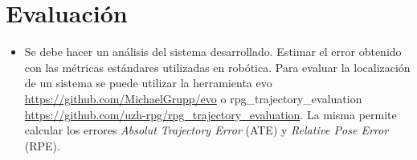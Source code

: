 \documentclass[tp]{lcc}
\begin{document}
	
	\section{Evaluación}
	\begin{itemize}
		\item Se debe hacer un análisis del sistema desarrollado. Estimar el error obtenido con las métricas estándares utilizadas en robótica. Para evaluar la localización de un sistema se puede utilizar la herramienta evo \url{https://github.com/MichaelGrupp/evo} o rpg\_trajectory\_evaluation \url{https://github.com/uzh-rpg/rpg_trajectory_evaluation}. La misma permite calcular los errores \emph{Absolut Trajectory Error} (ATE) y \emph{Relative Pose Error} (RPE).
	\end{itemize}
	

	\printbibliography
	
\end{document}
